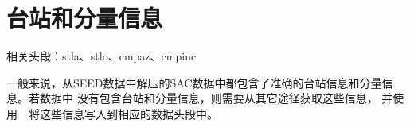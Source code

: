 \section{台站和分量信息}
相关头段：stla、stlo、cmpaz、cmpinc

一般来说，从SEED数据中解压的SAC数据中都包含了准确的台站信息和分量信息。若数据中
没有包含台站和分量信息，则需要从其它途径获取这些信息，
并使用~~将这些信息写入到相应的数据头段中。
